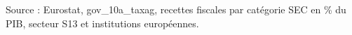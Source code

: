 Source : Eurostat, gov\_10a\_taxag, recettes fiscales par catégorie SEC en \% du PIB, secteur S13 et institutions européennes.
